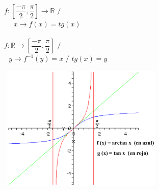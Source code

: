 \hfill
\begin{minipage}{.40\textwidth}

\begin{center}
$f:\left[ \dfrac{-\pi}{2},\dfrac{\pi}{2} \right] \longrightarrow \mathbb{R} $ $/$ \qquad $ $\\
$ $ \qquad $ $ \qquad $ $ \qquad $ $ \qquad $ x \longrightarrow f(x) = tg(x)$\\
\qquad \\

$f: \mathbb{R} \longrightarrow \left[ \dfrac{-\pi}{2}, \dfrac{\pi}{2} \right] $ $/$ \qquad $ $\\
$ $ \qquad $ $ \qquad $ y \longrightarrow f^{-1}(y) = x$ $/$ $ tg(x)=y$\\
\end{center}

\end{minipage}
\hfill 
\begin{minipage}{.50\textwidth}

\includegraphics[height=6cm,width=8cm]{arctg.eps}

\end{minipage}
\hfill \\
